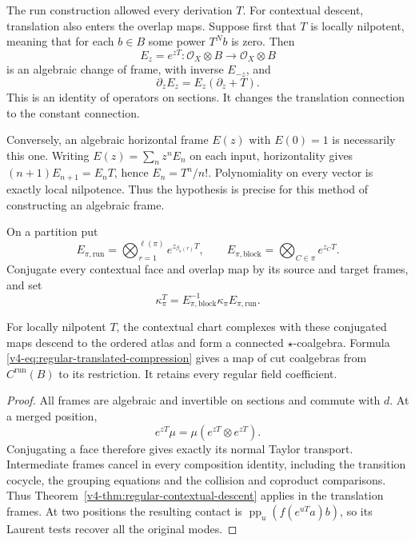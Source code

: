 The run construction allowed every derivation \(T\).
For contextual descent, translation also enters the
overlap maps. Suppose first that \(T\) is locally
nilpotent, meaning that for each \(b\in B\) some
power \(T^Nb\) is zero. Then
\[
 E_z=e^{zT}:\mathcal O_X\otimes B
                  \longrightarrow\mathcal O_X\otimes B
\]
is an algebraic change of frame, with inverse
\(E_{-z}\), and
\[
                  \partial_z E_z=E_z(\partial_z+T).
\]
This is an identity of operators on sections.
It changes the translation connection to the
constant connection.

Conversely, an algebraic horizontal frame \(E(z)\)
with \(E(0)=1\) is necessarily this one.
Writing \(E(z)=\sum_n z^nE_n\) on each input,
horizontality gives
\((n+1)E_{n+1}=E_nT\), hence \(E_n=T^n/n!\).
Polynomiality on every vector is exactly local
nilpotence. Thus the hypothesis is precise for
this method of constructing an algebraic frame.

On a partition put
\[
 E_{\pi,\mathrm{run}}
       =\bigotimes_{r=1}^{\ell(\pi)}
                         e^{z_{\beta_\pi(r)}T},
 \qquad
 E_{\pi,\mathrm{block}}
       =\bigotimes_{C\in\pi}e^{z_CT}.
\]
Conjugate every contextual face and overlap map
by its source and target frames, and set
\begin{equation}\label{v4-eq:regular-translated-compression}
 \kappa_\pi^T
       =E_{\pi,\mathrm{block}}^{-1}
                         \kappa_\pi E_{\pi,\mathrm{run}}.
\end{equation}

\begin{theorem}\label{v4-thm:regular-translated-descent}
For locally nilpotent \(T\), the contextual chart
complexes with these conjugated maps descend to
the ordered atlas and form a connected
\(\star\)-coalgebra. Formula
\eqref{v4-eq:regular-translated-compression}
gives a map of cut coalgebras from
\(C^{\mathrm{run}}(B)\) to its restriction.
It retains every regular field coefficient.
\end{theorem}

\begin{proof}
All frames are algebraic and invertible on
sections and commute with \(d\).
At a merged position,
\[
                  e^{zT}\mu=\mu(e^{zT}\otimes e^{zT}).
\]
Conjugating a face therefore gives exactly its
normal Taylor transport. Intermediate frames
cancel in every composition identity, including
the transition cocycle, the grouping equations
and the collision and coproduct comparisons.
Thus Theorem~\ref{v4-thm:regular-contextual-descent}
applies in the translation frames.
At two positions the resulting contact is
\(\operatorname{pp}_u(f(e^{uT}a)b)\), so its
Laurent tests recover all the original modes.
\end{proof}

